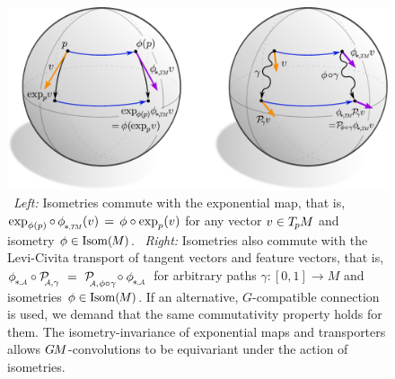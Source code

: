 \begin{figure}
    \centering
    \includegraphics[width=.9\columnwidth]{figures/isometry_exp_transport.pdf}
    \vspace*{1ex}
    \caption{\small
        \ \emph{Left:}
        Isometries commute with the exponential map, that is,
        $\exp_{\phi(p)} \circ\, \protect\dphiTM (v) \,=\, \phi \circ \exp_p(v)$
        for any vector $v\in T_{\mkern-1.5mu p}\mkern-.5muM$ and isometry $\phi\in \operatorname{Isom}(\mkern-1.5mu M \mkern-.5mu)$.
        \ \emph{Right:}
        Isometries also commute with the Levi-Civita transport of tangent vectors and feature vectors, that is,
        $\protect\dphiA\! \circ \protect\PAgamma \ =\ 
        \mathcal{P}_{\mkern-4mu\overset{}{\protect\scalebox{.6}{$\!\A$}, \mkern1mu\phi\circ\gamma}}\!
        \circ \protect\dphiA$
        for arbitrary paths $\gamma:[0,1]\to M$ and isometries $\phi\in \operatorname{Isom}(\mkern-1.5mu M \mkern-.5mu)$.
        If an alternative, $G$-compatible connection is used, we demand that the same commutativity property holds for them.
        The isometry-invariance of exponential maps and transporters allows $G\mkern-1.4muM$-convolutions to be equivariant under the action of isometries.
    }
    \label{fig:isom_exp_transport}
\end{figure}






